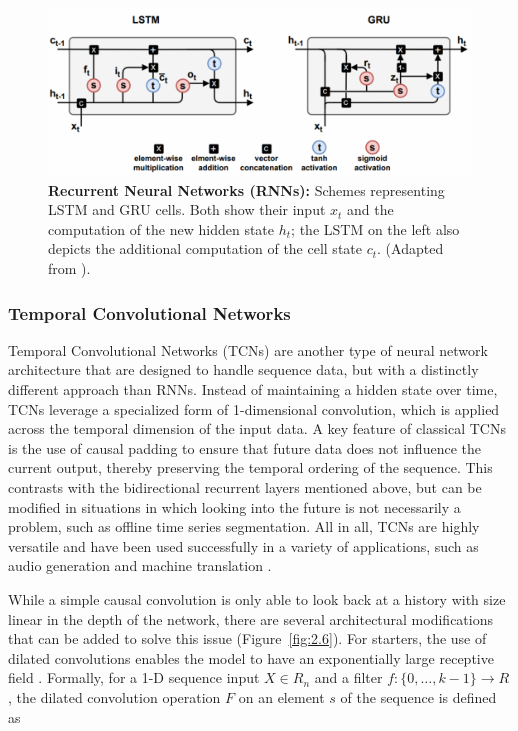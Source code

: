 \begin{figure}[!thb]
\centering
\includegraphics[width=\textwidth]{Figures/sota_5.pdf}

\caption[\textbf{Recurrent Neural Networks (RNNs)}]{\textbf{Recurrent Neural Networks (RNNs):} Schemes representing LSTM and GRU cells. Both show their input $x_t$ and the computation of the new hidden state $h_t$; the LSTM on the left also depicts the additional computation of the cell state $c_t$. (Adapted from \cite{Lafabregue2022End-to-endStudy}).}
\label{fig:2.5}

\end{figure}


\subsubsection{Temporal Convolutional Networks}

Temporal Convolutional Networks (TCNs) are another type of neural network architecture that are designed to handle sequence data, but with a distinctly different approach than RNNs. Instead of maintaining a hidden state over time, TCNs leverage a specialized form of 1-dimensional convolution, which is applied across the temporal dimension of the input data. A key feature of classical TCNs is the use of causal padding to ensure that future data does not influence the current output, thereby preserving the temporal ordering of the sequence. This contrasts with the bidirectional recurrent layers mentioned above, but can be modified in situations in which looking into the future is not necessarily a problem, such as offline time series segmentation. All in all, TCNs are highly versatile and have been used successfully in a variety of applications, such as audio generation and machine translation \cite{Bai2018AnModeling}.

While a simple causal convolution is only able to look back at a history with size linear in the depth of the network, there are several architectural modifications that can be added to solve this issue (Figure~\ref{fig:2.6}). For starters, the use of dilated convolutions enables the model to have an exponentially large receptive field \cite{Oord2016WaveNet:Audio}. Formally, for a 1-D sequence input $X \in R_n$ and a filter $f : \{0, \ldots , k - 1\} \rightarrow R$, the dilated convolution operation $F$ on an element $s$ of the sequence is defined as 

